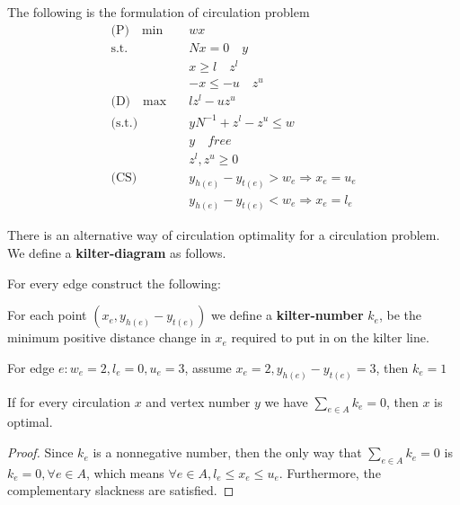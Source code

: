 			The following is the formulation of circulation problem
			\begin{align}
				\text{(P)} \quad \min \quad & wx\\
				\text{s.t.} \quad & Nx = 0 \quad y \\
								  & x \ge l \quad z^l \\
								  & -x \le -u \quad z^u\\
				\text{(D)} \quad \max \quad & lz^l - uz^u \\
				\text{(s.t.)} \quad & yN^{-1} + z^l-z^u \le w\\
									& y \quad free\\
									&z^l, z^u \ge 0 \\
				\text{(CS)} \quad & y_{h(e)} - y_{t(e)} > w_e \Rightarrow x_e = u_e\\
								  & y_{h(e)} - y_{t(e)} < w_e \Rightarrow x_e = l_e
			\end{align}

			There is an alternative way of circulation optimality for a circulation problem. We define a \textbf{kilter-diagram} as follows.

			For every edge construct the following:
			\begin{figure}
				\centering
			\end{figure}

			For each point $(x_e, y_{h(e)} - y_{t(e)})$ we define a \textbf{kilter-number} $k_e$, be the minimum positive distance change in $x_e$ required to put in on the kilter line.
			\begin{example}
				For edge $e: w_e = 2, l_e = 0, u_e = 3$, assume $x_e = 2, y_{h(e)} - y_{t(e)} = 3$, then $k_e = 1$
			\end{example}

			\begin{lemma}
				If for every circulation $x$ and vertex number $y$ we have $\sum_{e \in A} k_e = 0$, then $x$ is optimal.
			\end{lemma}

			\begin{proof}
				Since $k_e$ is a nonnegative number, then the only way that $\sum_{e \in A} k_e = 0$ is $k_e = 0, \forall e\in A$, which means $\forall e\in A, l_e \le x_e \le u_e$. Furthermore, the complementary slackness are satisfied.
			\end{proof}

